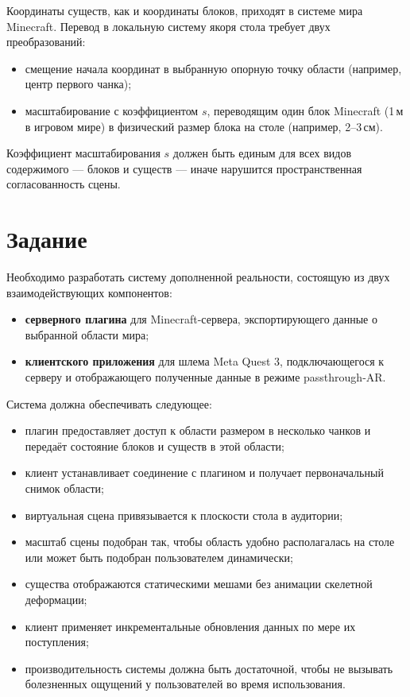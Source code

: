 \documentclass[a4paper,12pt]{article}
\begin{document}
Координаты существ, как и координаты блоков, приходят в системе мира Minecraft. Перевод в локальную систему якоря стола требует двух преобразований:

\begin{itemize}
    \item смещение начала координат в выбранную опорную точку области (например, центр первого чанка);
    \item масштабирование с коэффициентом $s$, переводящим один блок Minecraft (1\,м в игровом мире) в физический размер блока на столе (например, 2--3\,см).
\end{itemize}

Коэффициент масштабирования $s$ должен быть единым для всех видов содержимого --- блоков и существ --- иначе нарушится пространственная согласованность сцены.



\section*{Задание}

Необходимо разработать систему дополненной реальности, состоящую из двух взаимодействующих компонентов:

\begin{itemize}
    \item \textbf{серверного плагина} для Minecraft-сервера, экспортирующего данные о выбранной области мира;
    \item \textbf{клиентского приложения} для шлема Meta Quest 3, подключающегося к серверу и отображающего полученные данные в режиме passthrough-AR.
\end{itemize}

Система должна обеспечивать следующее:

\begin{itemize}
    \item плагин предоставляет доступ к области размером в несколько чанков и передаёт состояние блоков и существ в этой области;
    \item клиент устанавливает соединение с плагином и получает первоначальный снимок области;
    \item виртуальная сцена привязывается к плоскости стола в аудитории;
    \item масштаб сцены подобран так, чтобы область удобно располагалась на столе или может быть подобран пользователем динамически;
    \item существа отображаются статическими мешами без анимации скелетной деформации;
    \item клиент применяет инкрементальные обновления данных по мере их поступления;
    \item производительность системы должна быть достаточной, чтобы не вызывать болезненных ощущений у пользователей во время использования.
\end{itemize}
\end{document}
